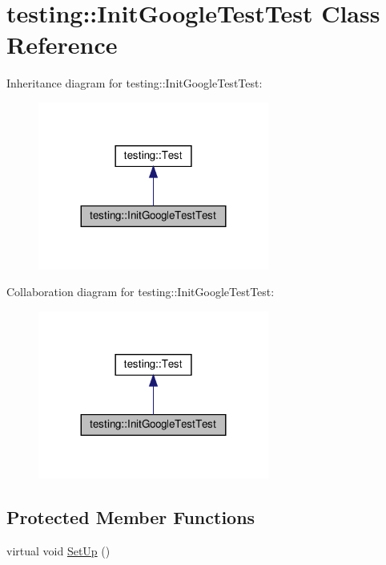 \hypertarget{classtesting_1_1_init_google_test_test}{}\section{testing\+:\+:Init\+Google\+Test\+Test Class Reference}
\label{classtesting_1_1_init_google_test_test}


Inheritance diagram for testing\+:\+:Init\+Google\+Test\+Test\+:
\nopagebreak
\begin{figure}[H]
\begin{center}
\leavevmode
\includegraphics[width=215pt]{classtesting_1_1_init_google_test_test__inherit__graph}
\end{center}
\end{figure}


Collaboration diagram for testing\+:\+:Init\+Google\+Test\+Test\+:
\nopagebreak
\begin{figure}[H]
\begin{center}
\leavevmode
\includegraphics[width=215pt]{classtesting_1_1_init_google_test_test__coll__graph}
\end{center}
\end{figure}
\subsection*{Protected Member Functions}
\begin{DoxyCompactItemize}
\item 
virtual void \hyperlink{classtesting_1_1_init_google_test_test_a49de9e552ea788c4b79924ec4135ca7a}{Set\+Up} ()
\end{DoxyCompactItemize}
